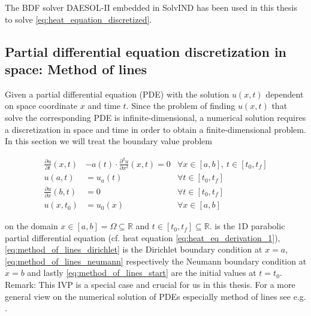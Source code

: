 \documentclass{scrartcl}[12pt, halfparskip]
\numberwithin{equation}{section}
\numberwithin{figure}{section}
\numberwithin{table}{section}
\begin{document}
The BDF solver DAESOL-II embedded in SolvIND has been used in this thesis to solve \cref{eq:heat_equation_discretized}.






\subsection{Partial differential equation discretization in space: Method of lines}
\label{sec:pde_discretization}


Given a partial differential equation (PDE) with the solution $u(x,t)$ dependent on space coordinate $x$ and time $t$. Since the problem of finding $u(x,t)$ that solve the corresponding PDE is infinite-dimensional, a numerical solution requires a discretization in space and time in order to obtain a finite-dimensional problem. \\
In this section we will treat the boundary value problem

\begin{subequations}
	\begin{align}
	\frac{\partial u}{\partial t}(x,t) & - a(t) \cdot \frac{\partial^2 u}{\partial x^2}(x,t) = 0 & \forall x \in [a,b], \ t \in [t_0,t_f] \label{eq:method_of_lines_pde} \\
	u(a,t) & = u_a(t)  & \forall t \in [t_0,t_f] \label{eq:method_of_lines_dirichlet} \\
	\frac{\partial u}{\partial x}(b,t) & = 0  & \forall t \in [t_0,t_f] \label{eq:method_of_lines_neumann}  \\
	u(x,t_0) & = u_0(x) & \forall x \in [a,b] \label{eq:method_of_lines_start}
	\end{align}
\end{subequations}

on the domain $x \in [a,b] = \Omega \subseteq \mathbb{R}$ and $t \in [t_0,t_f] \subseteq \mathbb{R}$.  is the 1D parabolic partial differential equation (cf. heat equation \eqref{eq:heat_eq_derivation_1}), \cref{eq:method_of_lines_dirichlet} is the Dirichlet boundary condition at $x=a$, \cref{eq:method_of_lines_neumann} respectively the Neumann boundary condition at $x=b$ and lastly \cref{eq:method_of_lines_start} are the initial values at ${t=t_0}$. \\
Remark: This IVP is a special case and crucial for us in this thesis. For a more general view on the numerical solution of PDEs especially method of lines see e.g. \cite{pde_buch_solin}. \\
\end{document}
